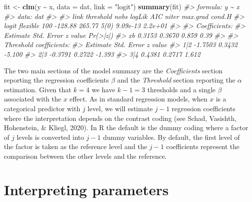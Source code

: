 \documentclass[
  man,floatsintext]{apa6}
\newenvironment{Shaded}{\begin{snugshade}}{\end{snugshade}}
\newcommand{\AttributeTok}[1]{\textcolor[rgb]{0.13,0.29,0.53}{#1}}
\newcommand{\CommentTok}[1]{\textcolor[rgb]{0.56,0.35,0.01}{\textit{#1}}}
\newcommand{\FunctionTok}[1]{\textcolor[rgb]{0.13,0.29,0.53}{\textbf{#1}}}
\newcommand{\NormalTok}[1]{#1}
\newcommand{\OtherTok}[1]{\textcolor[rgb]{0.56,0.35,0.01}{#1}}
\newcommand{\SpecialCharTok}[1]{\textcolor[rgb]{0.81,0.36,0.00}{\textbf{#1}}}
\newcommand{\StringTok}[1]{\textcolor[rgb]{0.31,0.60,0.02}{#1}}
\begin{document}
\normalsize

\scriptsize

\begin{Shaded}
\begin{Highlighting}[]
\NormalTok{fit }\OtherTok{\textless{}{-}} \FunctionTok{clm}\NormalTok{(y }\SpecialCharTok{\textasciitilde{}}\NormalTok{ x, }\AttributeTok{data =}\NormalTok{ dat, }\AttributeTok{link =} \StringTok{"logit"}\NormalTok{)}
\FunctionTok{summary}\NormalTok{(fit)}
\CommentTok{\#\textgreater{} formula: y \textasciitilde{} x}
\CommentTok{\#\textgreater{} data:    dat}
\CommentTok{\#\textgreater{} }
\CommentTok{\#\textgreater{}  link  threshold nobs logLik  AIC    niter max.grad cond.H }
\CommentTok{\#\textgreater{}  logit flexible  100  {-}128.88 265.77 5(0)  9.09e{-}13 2.2e+01}
\CommentTok{\#\textgreater{} }
\CommentTok{\#\textgreater{} Coefficients:}
\CommentTok{\#\textgreater{}    Estimate Std. Error z value Pr(\textgreater{}|z|)}
\CommentTok{\#\textgreater{} xb   0.3153     0.3670   0.859     0.39}
\CommentTok{\#\textgreater{} }
\CommentTok{\#\textgreater{} Threshold coefficients:}
\CommentTok{\#\textgreater{}     Estimate Std. Error z value}
\CommentTok{\#\textgreater{} 1|2  {-}1.7503     0.3432  {-}5.100}
\CommentTok{\#\textgreater{} 2|3  {-}0.3791     0.2722  {-}1.393}
\CommentTok{\#\textgreater{} 3|4   0.4381     0.2717   1.612}
\end{Highlighting}
\end{Shaded}

\normalsize

The two main sections of the model summary are the \emph{Coefficients} section reporting the regression coefficients \(\beta\) and the \emph{Threshold} section reporting the \(\alpha\) estimation. Given that \(k = 4\) we have \(k - 1 = 3\) thresholds and a single \(\beta\) associated with the \(x\) effect. As in standard regression models, when \(x\) is a categorical predictor with \(j\) level, we will estimate \(j - 1\) regression coefficients where the interpretation depends on the contrast coding (see Schad, Vasishth, Hohenstein, \& Kliegl, 2020). In R the default is the dummy coding where a factor of \(j\) levels is converted into \(j - 1\) dummy variables. By default, the first level of the factor is taken as the reference level and the \(j - 1\) coefficients represent the comparison between the other levels and the reference.

\section{Interpreting parameters}\label{interpreting-parameters}
\end{document}
